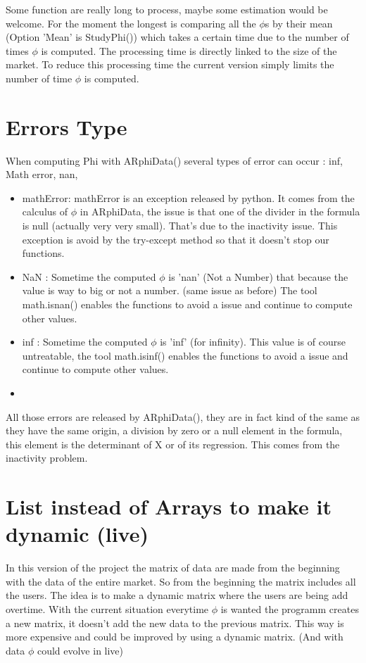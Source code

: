 \documentclass{report}
\begin{document}
Some function are really long to process, maybe some estimation would be welcome. For the moment the longest is comparing all the $\phi $s by their mean (Option 'Mean' is StudyPhi()) which takes a certain time due to the number of times $\phi $ is computed. The processing time is directly linked to the size of the market. To reduce this processing time the current version simply limits the number of time $\phi $ is computed.

\section{Errors Type}

When computing Phi with ARphiData() several types of error can occur : inf, Math error, nan, 
\begin{itemize}
\item mathError: mathError is an exception released by python. It comes from the calculus of $\phi $ in ARphiData, the issue is that one of the divider in the formula is null (actually very very small). That's due to the inactivity issue. This exception is avoid by the try-except method so that it doesn't stop our functions.
\item NaN : Sometime the computed $\phi $ is 'nan' (Not a Number) that because the value is way to big or not a number. (same issue as before) The tool math.isnan() enables the functions to avoid a issue and continue to compute other values.
\item inf : Sometime the computed $\phi $ is 'inf' (for infinity). This value is of course untreatable, the tool math.isinf() enables the functions to avoid a issue and continue to compute other values.
\item
\end{itemize}

All those errors are released by ARphiData(), they are in fact kind of the same as they have the same origin, a division by zero or a null element in the formula, this element is the determinant of X or of its regression. This comes from the inactivity problem.



\section{List instead of Arrays to make it dynamic (live)}

In this version of the project the matrix of data are made from the beginning with the data of the entire market. So from the beginning the matrix includes all the users. The idea is to make a dynamic matrix where the users are being add overtime. With the current situation everytime $\phi $ is wanted the programm creates a new matrix, it doesn't add the new data to the previous matrix. This way is more expensive and could be improved by using a dynamic matrix. (And with data $\phi $ could evolve in live)
\end{document}
